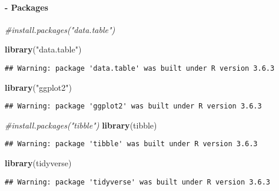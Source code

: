 \documentclass[
]{article}
\newenvironment{Shaded}{\begin{snugshade}}{\end{snugshade}}
\newcommand{\CommentTok}[1]{\textcolor[rgb]{0.56,0.35,0.01}{\textit{#1}}}
\newcommand{\KeywordTok}[1]{\textcolor[rgb]{0.13,0.29,0.53}{\textbf{#1}}}
\newcommand{\NormalTok}[1]{#1}
\newcommand{\StringTok}[1]{\textcolor[rgb]{0.31,0.60,0.02}{#1}}
\begin{document}
\hypertarget{packages}{%
\paragraph{- Packages}\label{packages}}

\begin{Shaded}
\begin{Highlighting}[]
\CommentTok{#install.packages("data.table")}
\end{Highlighting}
\end{Shaded}

\begin{Shaded}
\begin{Highlighting}[]
\KeywordTok{library}\NormalTok{(}\StringTok{"data.table"}\NormalTok{)}
\end{Highlighting}
\end{Shaded}

\begin{verbatim}
## Warning: package 'data.table' was built under R version 3.6.3
\end{verbatim}

\begin{Shaded}
\begin{Highlighting}[]
\KeywordTok{library}\NormalTok{(}\StringTok{"ggplot2"}\NormalTok{)}
\end{Highlighting}
\end{Shaded}

\begin{verbatim}
## Warning: package 'ggplot2' was built under R version 3.6.3
\end{verbatim}

\begin{Shaded}
\begin{Highlighting}[]
\CommentTok{#install.packages("tibble")}
\KeywordTok{library}\NormalTok{(tibble)}
\end{Highlighting}
\end{Shaded}

\begin{verbatim}
## Warning: package 'tibble' was built under R version 3.6.3
\end{verbatim}

\begin{Shaded}
\begin{Highlighting}[]
\KeywordTok{library}\NormalTok{(tidyverse)}
\end{Highlighting}
\end{Shaded}

\begin{verbatim}
## Warning: package 'tidyverse' was built under R version 3.6.3
\end{verbatim}
\end{document}

